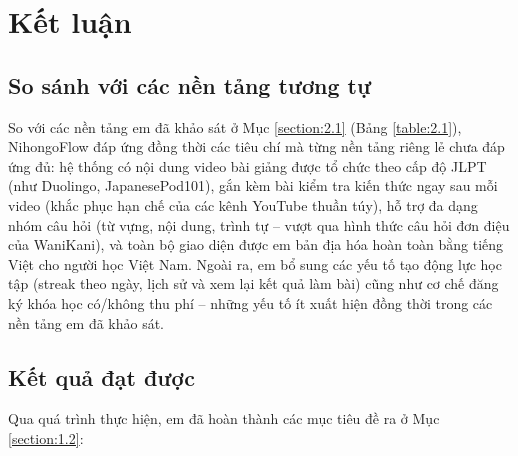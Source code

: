 \documentclass[../DoAn.tex]{subfiles}
\begin{document}
\section{Kết luận}
\label{section:6.1}

\subsection{So sánh với các nền tảng tương tự}

So với các nền tảng em đã khảo sát ở Mục \ref{section:2.1} (Bảng \ref{table:2.1}), NihongoFlow đáp ứng đồng thời các tiêu chí mà từng nền tảng riêng lẻ chưa đáp ứng đủ: hệ thống có nội dung video bài giảng được tổ chức theo cấp độ JLPT (như Duolingo, JapanesePod101), gắn kèm bài kiểm tra kiến thức ngay sau mỗi video (khắc phục hạn chế của các kênh YouTube thuần túy), hỗ trợ đa dạng nhóm câu hỏi (từ vựng, nội dung, trình tự -- vượt qua hình thức câu hỏi đơn điệu của WaniKani), và toàn bộ giao diện được em bản địa hóa hoàn toàn bằng tiếng Việt cho người học Việt Nam. Ngoài ra, em bổ sung các yếu tố tạo động lực học tập (streak theo ngày, lịch sử và xem lại kết quả làm bài) cũng như cơ chế đăng ký khóa học có/không thu phí -- những yếu tố ít xuất hiện đồng thời trong các nền tảng em đã khảo sát.

\subsection{Kết quả đạt được}

Qua quá trình thực hiện, em đã hoàn thành các mục tiêu đề ra ở Mục \ref{section:1.2}:
\end{document}
